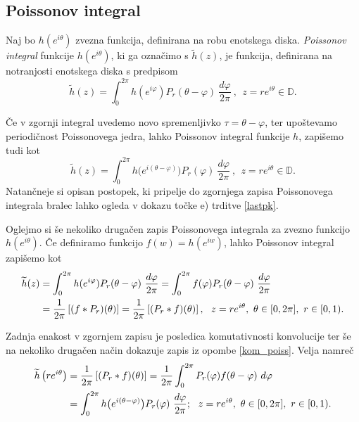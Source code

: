 \documentclass[mat1, tisk]{fmfdelo}
\begin{document}
\subsection{Poissonov integral}
    \begin{definicija}
        Naj bo $h(e^{i \theta})$ zvezna funkcija, definirana na robu enotskega diska.
        \emph{Poissonov integral} funkcije $h(e^{i\theta})$, ki ga označimo s $\widetilde{h}(z)$, je funkcija, definirana na notranjosti enotskega diska s predpisom
        $$
        \widetilde{h}(z) = \int_{0}^{2\pi}{h(e^{i\varphi}) P_r(\theta - \varphi)~\frac{d\varphi}{2 \pi}}~,~~z = r e^{i\theta} \in \mathbb{D}.
        $$
     \end{definicija}
     \begin{opomba}
        \label{kom_poiss}
        Če v zgornji integral uvedemo novo spremenljivko $\tau = \theta - \varphi$, ter upoštevamo periodičnost Poissonovega jedra, lahko Poissonov integral funkcije $h$, zapišemo tudi kot
        $$
        \widetilde{h}(z) = \int_{0}^{2\pi}{h\big(e^{i(\theta-\varphi)}\big) P_r(\varphi)~\frac{d\varphi}{2 \pi}}~,~~z = r e^{i\theta} \in \mathbb{D}.
        $$
        Natančneje si opisan postopek, ki pripelje do zgornjega zapisa Poissonovega integrala bralec lahko ogleda v dokazu točke e) trditve \ref{lastpk}.
     \end{opomba}

    Oglejmo si še nekoliko drugačen zapis Poissonovega integrala za zvezno funkcijo $h(e^{i \theta})$.
    Če definiramo funkcijo $f(w) = h(e^{iw})$, lahko Poissonov integral zapišemo kot
    \begin{align}
        \label{konv_Pr}
        \widetilde{h}(z) &= \int_{0}^{2\pi}{h(e^{i\varphi}) P_r(\theta - \varphi)~\frac{d\varphi}{2 \pi}} = \int_{0}^{2\pi}{f(\varphi) P_r(\theta - \varphi)~\frac{d\varphi}{2 \pi}} \notag \\
        & = \frac{1}{2\pi} \left[(f * P_r)(\theta)\right] = \frac{1}{2\pi} \left[(P_r * f)(\theta)\right],~~z = r e^{i\theta},~\theta \in [0,2\pi],~r\in[0,1).
    \end{align}
    \begin{opomba}
        Zadnja enakost v zgornjem zapisu je posledica komutativnosti konvolucije ter še na nekoliko drugačen način dokazuje zapis iz opombe \ref{kom_poiss}. Velja namreč
        \begin{align*}
            \widetilde{h}\left(r e^{i \theta}\right) &= \frac{1}{2\pi} \left[(P_r * f)(\theta)\right] =  \frac{1}{2 \pi}\int_{0}^{2\pi}{P_r(\varphi) f(\theta - \varphi) ~d\varphi} \\
            & = \int_{0}^{2\pi}{h\big(e^{i(\theta-\varphi)}\big) P_r(\varphi)~\frac{d\varphi}{2 \pi}};~~z = r e^{i\theta},~\theta \in [0,2\pi],~r\in[0,1). \notag
        \end{align*}
    \end{opomba}
\end{document}
